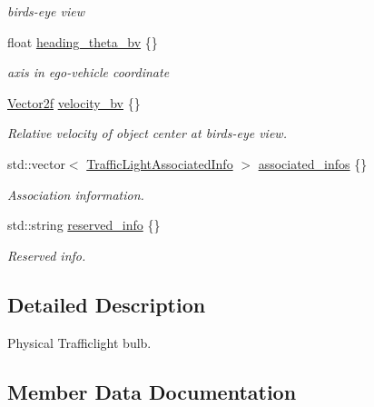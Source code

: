 \begin{DoxyCompactItemize}
\begin{DoxyCompactList}\small\item\em bird\textquotesingle{}s-\/eye view \end{DoxyCompactList}\item 
float \hyperlink{structmaf__perception__interface_1_1PhysicalTrafficLightBulb_a80384153e96e19b20ad7fd5d309ba858}{heading\+\_\+theta\+\_\+bv} \{\}
\begin{DoxyCompactList}\small\item\em axis in ego-\/vehicle coordinate \end{DoxyCompactList}\item 
\hyperlink{structmaf__perception__interface_1_1Vector2f}{Vector2f} \hyperlink{structmaf__perception__interface_1_1PhysicalTrafficLightBulb_a7968efa5a362fa7815c637cab06b2dff}{velocity\+\_\+bv} \{\}
\begin{DoxyCompactList}\small\item\em Relative velocity of object center at bird\textquotesingle{}s-\/eye view. \end{DoxyCompactList}\item 
std\+::vector$<$ \hyperlink{structmaf__perception__interface_1_1TrafficLightAssociatedInfo}{Traffic\+Light\+Associated\+Info} $>$ \hyperlink{structmaf__perception__interface_1_1PhysicalTrafficLightBulb_a4f880c51ed3b34f9b55fb4a9bfef9bfe}{associated\+\_\+infos} \{\}
\begin{DoxyCompactList}\small\item\em Association information. \end{DoxyCompactList}\item 
std\+::string \hyperlink{structmaf__perception__interface_1_1PhysicalTrafficLightBulb_ae4afaed291cd775480c5d4a4b9f8a212}{reserved\+\_\+info} \{\}
\begin{DoxyCompactList}\small\item\em Reserved info. \end{DoxyCompactList}\end{DoxyCompactItemize}


\subsection{Detailed Description}
Physical Trafficlight bulb. 

\subsection{Member Data Documentation}
\mbox{\label{structmaf__perception__interface_1_1PhysicalTrafficLightBulb_a4f880c51ed3b34f9b55fb4a9bfef9bfe}} 

